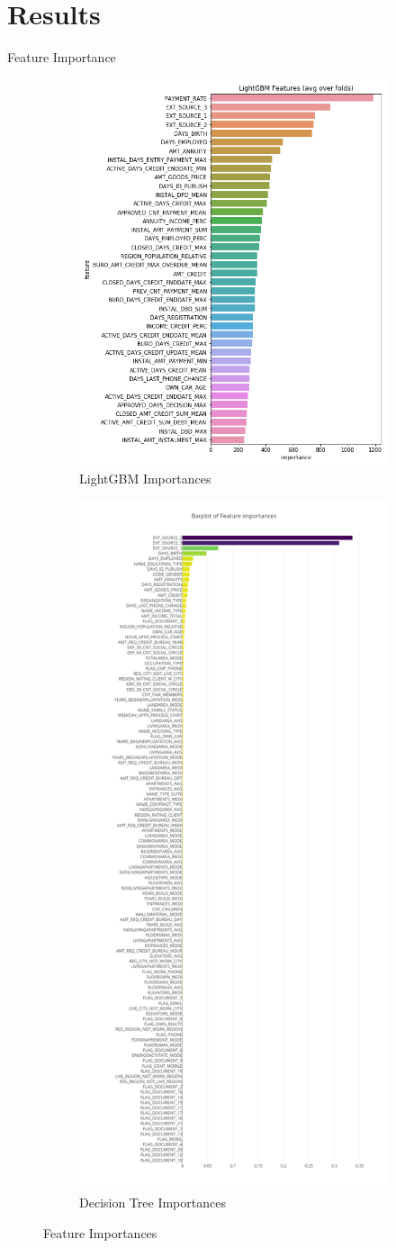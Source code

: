 \documentclass{beamer}
\begin{document}
\section{Results}
\begin{frame}{Feature Importance}
\begin{figure}
\centering
\begin{subfigure}{.5\textwidth}
  \centering
  \includegraphics[width=.6\linewidth]{pic/lgbm_importances01.png}
  \caption{LightGBM Importances}
  \label{fig:sub1}
\end{subfigure}%
\begin{subfigure}{.5\textwidth}
  \centering
  \includegraphics[width=.5\linewidth]{pic/dr_importances.png}
  \caption{Decision Tree Importances}
  \label{fig:sub2}
\end{subfigure}
\caption{Feature Importances}
\label{fig:feature_importances}
\end{figure}
\end{frame}
\end{document}
